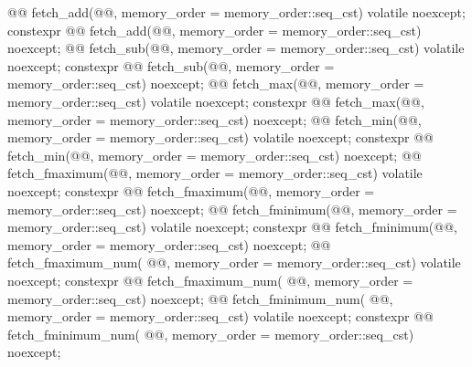 \begin{codeblock}
{{    @@ fetch_add(@@,
                                  memory_order = memory_order::seq_cst) volatile noexcept;
    constexpr @@ fetch_add(@@,
                                            memory_order = memory_order::seq_cst) noexcept;
    @@ fetch_sub(@@,
                                  memory_order = memory_order::seq_cst) volatile noexcept;
    constexpr @@ fetch_sub(@@,
                                            memory_order = memory_order::seq_cst) noexcept;
    @@ fetch_max(@@,
                                  memory_order = memory_order::seq_cst) volatile noexcept;
    constexpr @@ fetch_max(@@,
                                            memory_order = memory_order::seq_cst) noexcept;
    @@ fetch_min(@@,
                                  memory_order = memory_order::seq_cst) volatile noexcept;
    constexpr @@ fetch_min(@@,
                                            memory_order = memory_order::seq_cst) noexcept;
    @@ fetch_fmaximum(@@,
                                       memory_order = memory_order::seq_cst) volatile noexcept;
    constexpr @@ fetch_fmaximum(@@,
                                                 memory_order = memory_order::seq_cst) noexcept;
    @@ fetch_fminimum(@@,
                                       memory_order = memory_order::seq_cst) volatile noexcept;
    constexpr @@ fetch_fminimum(@@,
                                                 memory_order = memory_order::seq_cst) noexcept;
    @@ fetch_fmaximum_num(
      @@, memory_order = memory_order::seq_cst) volatile noexcept;
    constexpr @@ fetch_fmaximum_num(
      @@, memory_order = memory_order::seq_cst) noexcept;
    @@ fetch_fminimum_num(
      @@, memory_order = memory_order::seq_cst) volatile noexcept;
    constexpr @@ fetch_fminimum_num(
      @@, memory_order = memory_order::seq_cst) noexcept;

}}
\end{codeblock}
